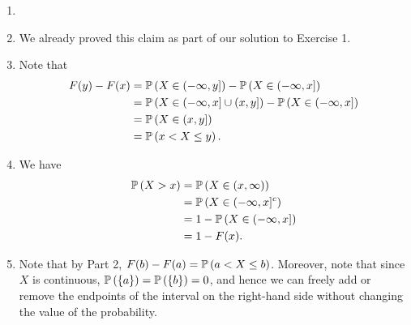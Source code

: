 \begin{ex}
  \begin{enumerate}[1.]
    \item[]
    \item We already proved this claim as part of our solution to Exercise 1.
    \item Note that
          \begin{align*}
            F(y) - F(x)
             & = \P{X\in (-\infty, y]} - \P{X\in (-\infty, x]}           \\
             & = \P{X\in (-\infty, x]\cup(x, y]} - \P{X\in (-\infty, x]} \\
             & = \P{X\in (x, y]}                                         \\
             & = \P{x < X\leq y}.
          \end{align*}
    \item We have
          \begin{align*}
            \P{X>x}
             & = \P{X\in (x, \infty)}      \\
             & = \P{X\in (-\infty, x]^c}   \\
             & = 1 - \P{X\in (-\infty, x]} \\
             & = 1 - F(x).
          \end{align*}
    \item Note that by Part 2, $F(b)-F(a)=\P{a<X\leq b}$. Moreover, note that
          since $X$ is continuous, $\P{\{a\}}=\P{\{b\}}=0$, and hence we can
          freely add or remove the endpoints of the interval on the right-hand
          side without changing the value of the probability.
  \end{enumerate}
\end{ex}

